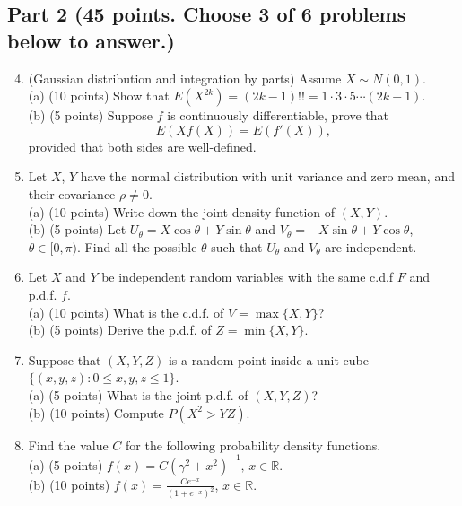 \documentclass[14pt]{extarticle}
\begin{document}
\subsection*{Part 2 (45 points. Choose 3 of 6 problems below to answer.)}
\begin{enumerate}
\setcounter{enumi}{3}

	\item (Gaussian distribution and integration by parts) Assume $X\sim N(0,1)$.\\
	(a) (10 points) Show that $E(X^{2k})=(2k-1)!!=1\cdot 3\cdot 5\cdots (2k-1)$.\\
	(b) (5 points) Suppose $f$ is continuously differentiable, prove that
	\begin{equation*}
	E(Xf(X))=E(f'(X)),
	\end{equation*}
	provided that both sides are well-defined.

    \item Let $X$, $Y$ have the normal distribution with unit variance and zero mean, and their covariance $\rho\neq 0$.\\
    (a) (10 points) Write down the joint density function of $(X,Y)$.\\
    (b) (5 points) Let $U_\theta=X\cos\theta+Y\sin\theta$ and $V_\theta=-X\sin\theta+Y\cos\theta$, $\theta\in[0,\pi)$. Find all the possible $\theta$ such that $U_\theta$ and $V_\theta$ are independent.

    \item Let $X$ and $Y$ be independent random variables with the same c.d.f $F$ and p.d.f. $f$.\\
    (a) (10 points) What is the c.d.f. of $V=\max\{X,Y\}$?\\
    (b) (5 points) Derive the p.d.f. of $Z=\min\{X,Y\}$.

    \item Suppose that $(X,Y,Z)$ is a random point inside a unit cube $\{(x,y,z):0\leq x,y,z\leq 1\}$.\\
    (a) (5 points) What is the joint p.d.f. of $(X,Y,Z)$?\\
    (b) (10 points) Compute $P(X^2>YZ)$.\\

    \item Find the value $C$ for the following probability density functions.\\
    (a) (5 points) $f(x)=C(\gamma^2+x^2)^{-1},\,x\in\mathbb{R}$.\\
    (b) (10 points) $f(x)=\frac{Ce^{-x}}{(1+e^{-x})^2}$, $x\in\mathbb{R}$.\\
    

\end{enumerate}
\end{document}
